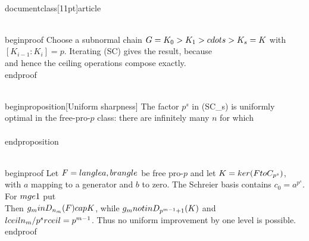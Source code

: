 \\documentclass[11pt]{article}
\begin{document}
\\begin{proof}
Choose a subnormal chain
$G=K_0>K_1>\\cdots>K_s=K$
with $[K_{i-1}:K_i]=p$. Iterating (SC) gives the result, because
\\[
\\left\\lceil\\frac{\\lceil m/p\\rceil}{p}\\right\\rceil
=
\\left\\lceil\\frac m{p^2}\\right\\rceil
\\]
and hence the ceiling operations compose exactly.
\\end{proof}

\\begin{proposition}[Uniform sharpness]
The factor $p^s$ in (SC_s) is uniformly optimal in the free-pro-$p$ class: there are infinitely many $n$ for which
\\[
D_n(F)\\cap K\\not\\subseteq D_{\\lceil n/p^s\\rceil+1}(K).
\\]
\\end{proposition}

\\begin{proof}
Let $F=\\langle a,b\\rangle$ be free pro-$p$ and let
$K=\\ker(F\\to C_{p^s})$, with $a$ mapping to a generator and $b$ to zero.
The Schreier basis contains $c_0=a^{p^s}$. For $m\\ge1$ put
\\[
g_m=a^{p^{m+s-1}}=c_0^{p^{m-1}},
\\qquad
n_m=p^{m+s-1}.
\\]
Then $g_m\\in D_{n_m}(F)\\cap K$, while
$g_m\\notin D_{p^{m-1}+1}(K)$ and
$\\lceil n_m/p^s\\rceil=p^{m-1}$. Thus no uniform improvement by one level is possible.
\\end{proof}
\end{document}
